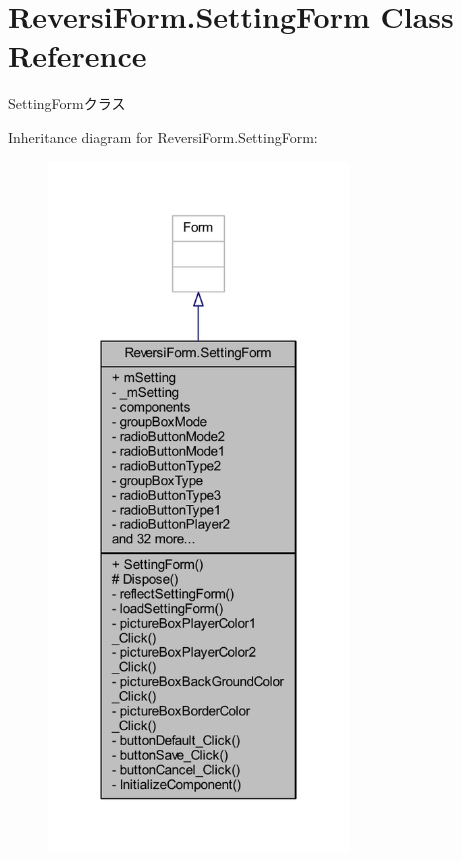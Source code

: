 \hypertarget{class_reversi_form_1_1_setting_form}{}\section{Reversi\+Form.\+Setting\+Form Class Reference}
\label{class_reversi_form_1_1_setting_form}


Setting\+Formクラス  




Inheritance diagram for Reversi\+Form.\+Setting\+Form\+:\nopagebreak
\begin{figure}[H]
\begin{center}
\leavevmode
\includegraphics[width=226pt]{class_reversi_form_1_1_setting_form__inherit__graph}
\end{center}
\end{figure}


